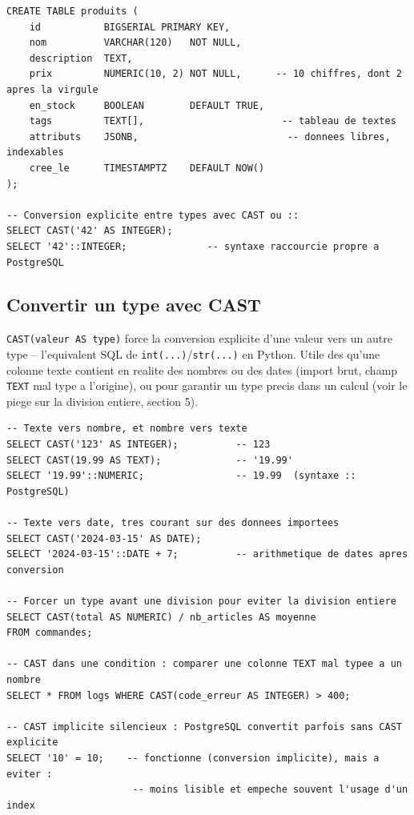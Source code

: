 \documentclass[11pt,a4paper]{article}
\begin{document}
\begin{lstlisting}
CREATE TABLE produits (
    id           BIGSERIAL PRIMARY KEY,
    nom          VARCHAR(120)   NOT NULL,
    description  TEXT,
    prix         NUMERIC(10, 2) NOT NULL,      -- 10 chiffres, dont 2 apres la virgule
    en_stock     BOOLEAN        DEFAULT TRUE,
    tags         TEXT[],                        -- tableau de textes
    attributs    JSONB,                          -- donnees libres, indexables
    cree_le      TIMESTAMPTZ    DEFAULT NOW()
);

-- Conversion explicite entre types avec CAST ou ::
SELECT CAST('42' AS INTEGER);
SELECT '42'::INTEGER;              -- syntaxe raccourcie propre a PostgreSQL
\end{lstlisting}

\subsection{Convertir un type avec CAST}
\texttt{CAST(valeur AS type)} force la conversion explicite d'une valeur vers
un autre type -- l'equivalent SQL de \texttt{int(...)}/\texttt{str(...)} en
Python. Utile des qu'une colonne texte contient en realite des nombres ou des
dates (import brut, champ \texttt{TEXT} mal type a l'origine), ou pour
garantir un type precis dans un calcul (voir le piege sur la division
entiere, section 5).

\begin{lstlisting}
-- Texte vers nombre, et nombre vers texte
SELECT CAST('123' AS INTEGER);          -- 123
SELECT CAST(19.99 AS TEXT);             -- '19.99'
SELECT '19.99'::NUMERIC;                -- 19.99  (syntaxe :: PostgreSQL)

-- Texte vers date, tres courant sur des donnees importees
SELECT CAST('2024-03-15' AS DATE);
SELECT '2024-03-15'::DATE + 7;          -- arithmetique de dates apres conversion

-- Forcer un type avant une division pour eviter la division entiere
SELECT CAST(total AS NUMERIC) / nb_articles AS moyenne
FROM commandes;

-- CAST dans une condition : comparer une colonne TEXT mal typee a un nombre
SELECT * FROM logs WHERE CAST(code_erreur AS INTEGER) > 400;

-- CAST implicite silencieux : PostgreSQL convertit parfois sans CAST explicite
SELECT '10' = 10;    -- fonctionne (conversion implicite), mais a eviter :
                      -- moins lisible et empeche souvent l'usage d'un index
\end{lstlisting}
\end{document}
